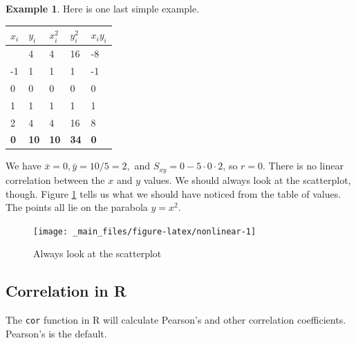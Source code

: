 \documentclass[
]{book}
\newenvironment{Shaded}{\begin{snugshade}}{\end{snugshade}}
\newcommand{\FunctionTok}[1]{\textcolor[rgb]{0.13,0.29,0.53}{\textbf{#1}}}
\newcommand{\NormalTok}[1]{#1}
\newcommand{\SpecialCharTok}[1]{\textcolor[rgb]{0.81,0.36,0.00}{\textbf{#1}}}
\theoremstyle{definition}
\theoremstyle{definition}
\newtheorem{example}{Example}[chapter]
\theoremstyle{definition}
\theoremstyle{definition}
\theoremstyle{remark}
\begin{document}
\begin{examplebox}

\begin{example}
Here is one last simple example.

\begin{longtable}[]{@{}lllll@{}}
\toprule\noalign{}
\(x_i\) & \(y_i\) & \(x_i^2\) & \(y_i^2\) & \(x_i y_i\) \\
\midrule\noalign{}
\endhead
\bottomrule\noalign{}
\endlastfoot
-2 & 4 & 4 & 16 & -8 \\
-1 & 1 & 1 & 1 & -1 \\
0 & 0 & 0 & 0 & 0 \\
1 & 1 & 1 & 1 & 1 \\
2 & 4 & 4 & 16 & 8 \\
\textbf{0} & \textbf{10} & \textbf{10} & \textbf{34} & \textbf{0 } \\
\end{longtable}

We have \(\bar{x}=0,\bar{y}=10/5=2,\) and \(S_{xy}=0-5\cdot0\cdot2\), so \(r=0.\) There is no linear correlation between the \(x\) and \(y\) values. We should always look at the scatterplot, though. Figure \ref{fig:nonlinear} tells us what we should have noticed from the table of values. The points all lie on the parabola \(y=x^2.\)
\end{example}

\end{examplebox}

\begin{figure}

{\centering \texttt{[image: \_main\_files/figure-latex/nonlinear-1]} 

}

\caption{Always look at the scatterplot}\label{fig:nonlinear}
\end{figure}

\pagebreak

\subsection*{Correlation in R}\label{correlation-in-r}

The \texttt{cor} function in R will calculate Pearson's and other correlation coefficients. Pearson's is the default.

\begin{Shaded}
\end{Shaded}
\end{document}
